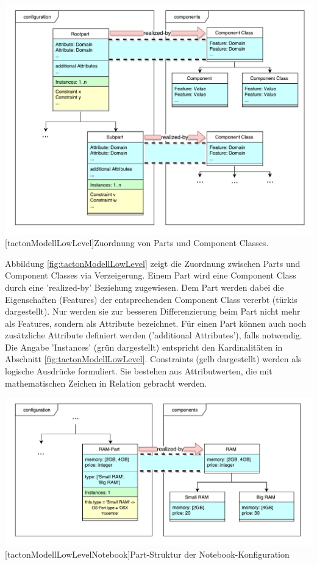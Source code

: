 \documentclass[12pt,a4paper,bibliography=totocnumbered,listof=totoc]{scrartcl}
\begin{document}
\vspace{1em}
\begin{minipage}{\linewidth}
	\centering
	\includegraphics[width=1\linewidth]{Abbildungen/tactonModellLowLevel.pdf}
	[tactonModellLowLevel]{Zuordnung von Parts und Component Classes.}
	\label{fig:tactonModellLowLevel}
\end{minipage}
\vspace{1em}

Abbildung \ref{fig:tactonModellLowLevel} zeigt die Zuordnung zwischen Parts und Component Classes via Verzeigerung. Einem Part wird eine Component Class durch eine 'realized-by' Beziehung zugewiesen. Dem Part werden dabei die Eigenschaften (Features) der entsprechenden Component Class vererbt (türkis dargestellt). Nur werden sie zur besseren Differenzierung beim Part nicht mehr als Features, sondern als Attribute bezeichnet. Für einen Part können auch noch zusätzliche Attribute definiert werden ('additional Attributes'), falls notwendig. Die Angabe 'Instances' (grün dargestellt) entspricht den Kardinalitäten in Abschnitt \ref{fig:tactonModellLowLevel}. Constraints (gelb dargestellt) werden als logische Ausdrücke formuliert. Sie bestehen aus Attributwerten, die mit mathematischen Zeichen in Relation gebracht werden.

\vspace{1em}
\begin{minipage}{\linewidth}
	\centering
	\includegraphics[width=1\linewidth]{Abbildungen/tactonModellLowLevelNotebook.pdf}
	[tactonModellLowLevelNotebook]{Part-Struktur der Notebook-Konfiguration}
	\label{fig:tactonModellLowLevelNotebook}
\end{minipage}
\vspace{1em}
\end{document}
